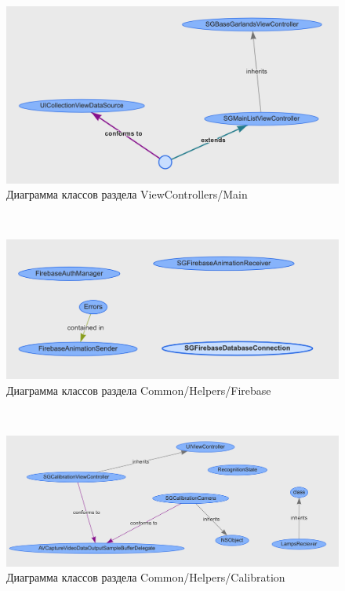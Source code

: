 ~
\begin{figure}[H]
\centering
	\includegraphics[scale=0.5]{figures/diagrams/class/mainList.png}
	\caption{Диаграмма классов раздела ViewControllers/Main}
	\label{fig:appendices:classDiagram:mainList}
\end{figure}
~
\begin{figure}[H]
\centering
	\includegraphics[scale=0.5]{figures/diagrams/class/firebase.png}
	\caption{Диаграмма классов раздела Common/Helpers/Firebase}
	\label{fig:appendices:classDiagram:firebase}
\end{figure}
~
\begin{figure}[H]
\centering
	\includegraphics[scale=0.5]{figures/diagrams/class/calibration.png}
	\caption{Диаграмма классов раздела Common/Helpers/Calibration}
	\label{fig:appendices:classDiagram:calibration}
\end{figure}
